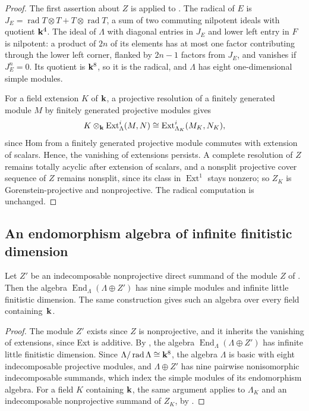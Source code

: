 \begin{proof}
  The first assertion about $Z$ is  applied to
  . The radical of $E$ is ${J_E=\operatorname{rad}T\otimes T+
  T\otimes\operatorname{rad}T}$, a sum of two commuting nilpotent ideals with
  quotient $\mathbf{k}^4$. The ideal of $\Lambda$ with diagonal entries in $J_E$ and
  lower left entry in $F$ is nilpotent: a product of $2n$ of its elements has
  at most one factor contributing through the lower left corner, flanked by
  ${2n-1}$ factors from $J_E$, and vanishes if ${J_E^n=0}$. Its quotient is
  $\mathbf{k}^8$, so it is the radical, and $\Lambda$ has eight one-dimensional simple
  modules.

  For a field extension $K$ of $\mathbf{k}$, a projective resolution of a finitely
  generated module $M$ by finitely generated projective modules gives
  \[
    K\otimes_{\mathbf{k}}\operatorname{Ext}^i_\Lambda(M,N)\cong
    \operatorname{Ext}^i_{\Lambda_K}(M_K,N_K),
  \]
  since Hom from a finitely
  generated projective module commutes with extension of scalars. Hence, the
  vanishing of extensions persists. A complete resolution of $Z$ remains totally
  acyclic after extension of scalars, and a nonsplit projective cover sequence
  of $Z$ remains nonsplit, since its class in $\operatorname{Ext}^1$ stays
  nonzero; so $Z_K$ is Gorenstein-projective and nonprojective. The radical
  computation is unchanged.
\end{proof}

\subsection{An endomorphism algebra of infinite finitistic dimension}
\label{subsec:ar-consequences}

\begin{corollary}
  \label{coro:ar-findim}
  Let $Z'$ be an indecomposable nonprojective direct summand of the module $Z$
  of . Then the algebra
  ${\operatorname{End}_\Lambda(\Lambda\oplus Z')}$ has nine simple modules and
  infinite little finitistic dimension. The same construction gives such an
  algebra over every field containing~$\mathbf{k}$.
\end{corollary}

\begin{proof}
  The module $Z'$ exists since $Z$ is nonprojective, and it inherits the
  vanishing of extensions, since Ext is additive. By ,
  the algebra ${\operatorname{End}_\Lambda(\Lambda\oplus Z')}$ has infinite
  little finitistic dimension. Since ${\Lambda/\operatorname{rad}\Lambda\cong
  \mathbf{k}^8}$, the algebra $\Lambda$ is basic with eight indecomposable projective
  modules, and ${\Lambda\oplus Z'}$ has nine pairwise nonisomorphic
  indecomposable summands, which index the simple modules of its endomorphism
  algebra. For a field $K$ containing $\mathbf{k}$, the same argument applies to
  $\Lambda_K$ and an indecomposable nonprojective summand of $Z_K$, by
  .
\end{proof}

